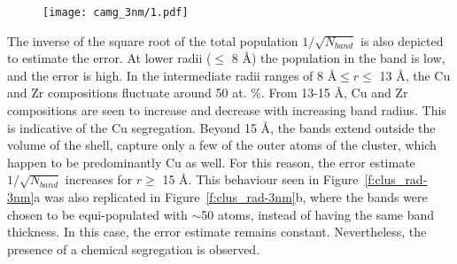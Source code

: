 \begin{changebar}
	\begin{figure}%
		\centering
		\texttt{[image: camg\_3nm/1.pdf]}
		\label{f:clus_comp-3nm}
	\end{figure}
\end{changebar}

The inverse of the square root of the total population $1/\sqrt{N_{band}}$ is also depicted to estimate the error. At lower radii ($\leq$ 8 \r{A}) the population in the band is low, and the error is high. In the intermediate radii ranges of 8 \r{A}$\leq r \leq$ 13 \r{A}, the Cu and Zr compositions fluctuate around 50 at. \%. From 13-15 \r{A}, Cu and Zr compositions are seen to increase and decrease with increasing band radius. This is indicative of the Cu segregation. Beyond 15 \r{A}, the bands extend outside the volume of the shell, capture only a few of the outer atoms of the cluster, which happen to be predominantly Cu as well. For this reason, the error estimate $1/\sqrt{N_{band}}$ increases for $r \geq $ 15 \r{A}. This behaviour seen in Figure~\ref{f:clus_rad-3nm}a was also replicated in Figure~\ref{f:clus_rad-3nm}b, where the bands were chosen to be equi-populated with $\sim$50 atoms, instead of having the same band thickness. In this case, the error estimate remains constant. Nevertheless, the presence of a chemical segregation is observed. \par


